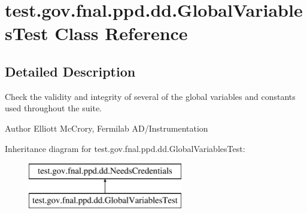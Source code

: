\hypertarget{classtest_1_1gov_1_1fnal_1_1ppd_1_1dd_1_1GlobalVariablesTest}{\section{test.\-gov.\-fnal.\-ppd.\-dd.\-Global\-Variables\-Test Class Reference}
\label{classtest_1_1gov_1_1fnal_1_1ppd_1_1dd_1_1GlobalVariablesTest}
}


\subsection{Detailed Description}
Check the validity and integrity of several of the global variables and constants used throughout the suite.

\begin{DoxyAuthor}{Author}
Elliott Mc\-Crory, Fermilab A\-D/\-Instrumentation 
\end{DoxyAuthor}
Inheritance diagram for test.\-gov.\-fnal.\-ppd.\-dd.\-Global\-Variables\-Test\-:\begin{figure}[H]
\begin{center}
\leavevmode
\includegraphics[height=2.000000cm]{classtest_1_1gov_1_1fnal_1_1ppd_1_1dd_1_1GlobalVariablesTest}
\end{center}
\end{figure}
